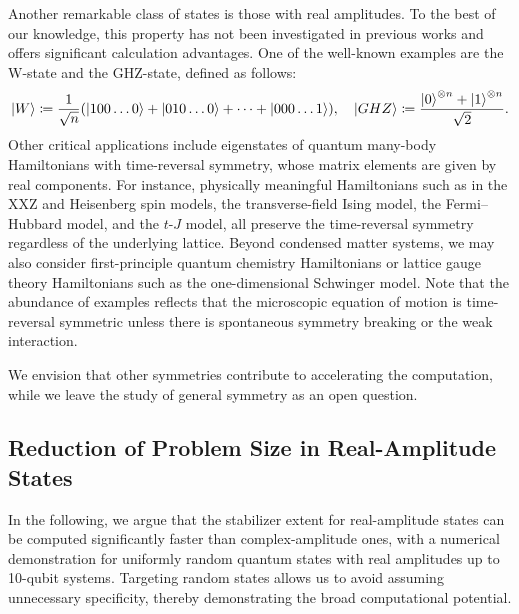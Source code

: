 \documentclass[aps,prx,onecolumn,superscriptaddress,nobibnotes,nofootinbib]{revtex4-2}
\newcommand{\defeq}{\coloneqq}
\begin{document}
Another remarkable class of states is those with real amplitudes.
To the best of our knowledge, this property has not been investigated in previous works and offers significant calculation advantages.
One of the well-known examples are the W-state and the GHZ-state, defined as follows:
\begin{equation*}
  \ket{W} \defeq \frac{1}{\sqrt{n}} \qty(\ket{100\dots0}+\ket{010\dots0}+\dots+\ket{000\dots1}), \quad \ket{GHZ} \defeq \frac{\ket{0}^{\otimes n} + \ket{1}^{\otimes n}}{\sqrt{2}}.
\end{equation*}
Other critical applications include eigenstates of quantum many-body Hamiltonians with time-reversal symmetry, whose matrix elements are given by real components.
For instance, physically meaningful Hamiltonians such as in the XXZ and Heisenberg spin models, the transverse-field Ising model, the Fermi--Hubbard model, and the $t$-$J$ model, all preserve the time-reversal symmetry regardless of the underlying lattice. Beyond condensed matter systems, we may also consider first-principle quantum chemistry Hamiltonians or lattice gauge theory Hamiltonians such as the one-dimensional Schwinger model. Note that the abundance of examples reflects that the microscopic equation of motion is time-reversal symmetric unless there is spontaneous symmetry breaking or the weak interaction.

We envision that other symmetries contribute to accelerating the computation, while we leave the study of general symmetry as an open question.

\subsection{Reduction of Problem Size in Real-Amplitude States}

In the following, we argue that the stabilizer extent for real-amplitude states can be computed significantly faster than complex-amplitude ones, with a numerical demonstration for uniformly random quantum states with real amplitudes up to 10-qubit systems.
Targeting random states allows us to avoid assuming
unnecessary specificity, thereby demonstrating
the broad computational potential.
\end{document}
